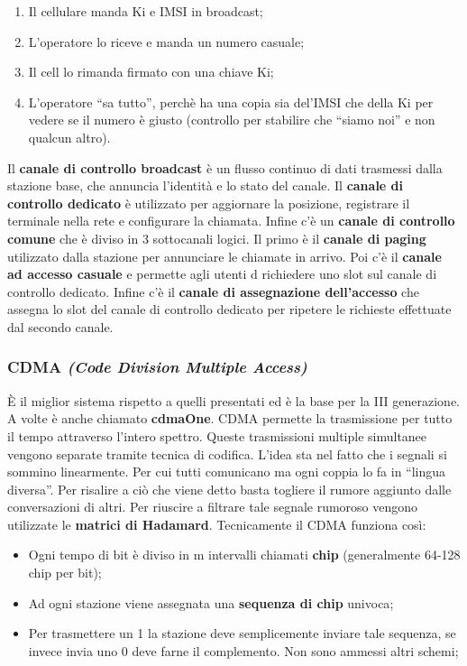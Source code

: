 \begin{enumerate}

\item{Il cellulare manda Ki e IMSI in broadcast};
\item{L'operatore lo riceve e manda un numero casuale};
\item{Il cell lo rimanda firmato con una chiave Ki};
\item{L'operatore ``sa tutto'', perchè ha una copia sia del'IMSI che della Ki per vedere se il numero è giusto (controllo per stabilire che ``siamo noi'' e non qualcun altro)}.

\end{enumerate}

Il \textbf{canale di controllo broadcast} è un flusso continuo di dati trasmessi dalla stazione base, che annuncia l'identità e lo stato del canale. Il \textbf{canale di controllo dedicato} è utilizzato per aggiornare la posizione, registrare il terminale nella rete e configurare la chiamata. Infine c'è un \textbf{canale di controllo comune} che è diviso in 3 sottocanali logici. Il primo è il \textbf{canale di paging} utilizzato dalla stazione per annunciare le chiamate in arrivo. Poi c'è il \textbf{canale ad accesso casuale} e permette agli utenti d richiedere uno slot sul canale di controllo dedicato. Infine c'è il \textbf{canale di assegnazione dell'accesso} che assegna lo slot del canale di controllo dedicato per ripetere le richieste effettuate dal secondo canale.

\subsubsection*{CDMA \textit{(Code Division Multiple Access)}}

È il miglior sistema rispetto a quelli presentati ed è la base per la III generazione. A volte è anche chiamato \textbf{cdmaOne}. CDMA permette la trasmissione per tutto il tempo attraverso l'intero spettro. Queste trasmissioni multiple simultanee vengono separate tramite tecnica di codifica. L'idea sta nel fatto che i segnali si sommino linearmente. Per cui tutti comunicano ma ogni coppia lo fa in ``lingua diversa''. Per risalire a ciò che viene detto basta togliere il rumore aggiunto dalle conversazioni di altri. Per riuscire a filtrare tale segnale rumoroso vengono utilizzate le \textbf{matrici di Hadamard}. Tecnicamente il CDMA funziona così:

\begin{itemize}

\item{Ogni tempo di bit è diviso in m intervalli chiamati \textbf{chip} (generalmente 64-128 chip per bit)};
\item{Ad ogni stazione viene assegnata una \textbf{sequenza di chip} univoca};
\item {Per trasmettere un 1 la stazione deve semplicemente inviare tale sequenza, se invece invia uno 0 deve farne il complemento. Non sono ammessi altri schemi};

\end{itemize}

